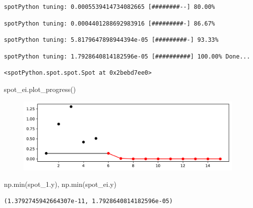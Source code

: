 \documentclass[
  letterpaper,
  DIV=11,
  numbers=noendperiod]{scrreprt}
\newenvironment{Shaded}{\begin{snugshade}}{\end{snugshade}}
\newcommand{\BuiltInTok}[1]{\textcolor[rgb]{0.00,0.23,0.31}{#1}}
\newcommand{\NormalTok}[1]{\textcolor[rgb]{0.00,0.23,0.31}{#1}}
\begin{document}
\begin{verbatim}
spotPython tuning: 0.0005539414734082665 [########--] 80.00% 
\end{verbatim}

\begin{verbatim}
spotPython tuning: 0.0004401288692983916 [#########-] 86.67% 
\end{verbatim}

\begin{verbatim}
spotPython tuning: 5.8179647898944394e-05 [#########-] 93.33% 
\end{verbatim}

\begin{verbatim}
spotPython tuning: 1.7928640814182596e-05 [##########] 100.00% Done...
\end{verbatim}

\begin{verbatim}
<spotPython.spot.spot.Spot at 0x2bebd7ee0>
\end{verbatim}

\begin{Shaded}
\begin{Highlighting}[]
\NormalTok{spot\_ei.plot\_progress()}
\end{Highlighting}
\end{Shaded}

\begin{figure}[H]

{\centering \includegraphics{07_spot_ei_files/figure-pdf/cell-19-output-1.pdf}

}

\end{figure}

\begin{Shaded}
\begin{Highlighting}[]
\NormalTok{np.}\BuiltInTok{min}\NormalTok{(spot\_1.y), np.}\BuiltInTok{min}\NormalTok{(spot\_ei.y)}
\end{Highlighting}
\end{Shaded}

\begin{verbatim}
(1.3792745942664307e-11, 1.7928640814182596e-05)
\end{verbatim}
\end{document}

